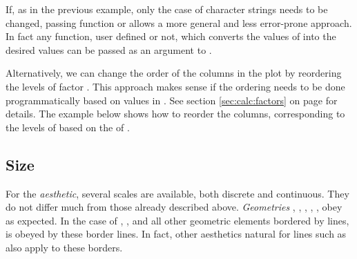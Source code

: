 \documentclass[krantz2]{krantz}\usepackage{knitr}
\begin{document}
If, as in the previous example, only the case of character strings needs to be changed, passing function  or  allows a more general and less error-prone approach. In fact any function, user defined or not, which converts the values of  into the desired values can be passed as an argument to .

\begin{knitrout}\footnotesize
{}\color{fgcolor}\begin{kframe}
\begin{alltt}
  \hlstd{(} \hlstd{=} \hlstd{(}\hlstd{,} \hlstd{,} \hlstd{),}
                    
\end{alltt}
\end{kframe}
\end{knitrout}

Alternatively, we can change the order of the columns in the plot by reordering the levels of factor . This approach makes sense if the ordering needs to be done programmatically based on values in . See section \ref{sec:calc:factors} on page \pageref{sec:calc:factors} for details. The example below shows how to reorder the columns, corresponding to the levels of  based on the  of .

\begin{knitrout}\footnotesize
{}\color{fgcolor}\begin{kframe}
\begin{alltt}
 \hlstd{(}\hlstd{(} \hlstd{=}      \hlopt{+}
  \hlstd{(} \hlstd{=} \hlstd{,}  
\end{alltt}
\end{kframe}
\end{knitrout}


\subsection{Size}
For the  \emph{aesthetic}, several scales are available, both discrete and continuous. They do not differ much from those already described above. \emph{Geometries} , , , , ,  obey  as expected. In the case of , ,  and all other geometric elements bordered by lines,  is obeyed by these border lines. In fact, other aesthetics natural for lines such as  also apply to these borders.
\end{document}
